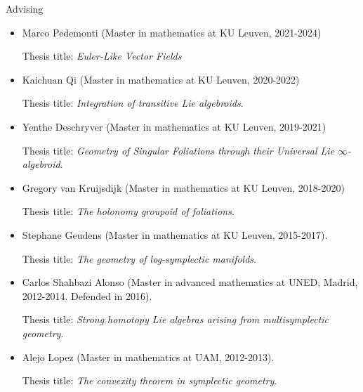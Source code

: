 \documentclass[12p]{resume}
\begin{document}
\begin{category}{Advising}
\begin{itemize}
Thesis title: \emph{Multisymplectic Manifolds and their Symmetries}

\item Marco Pedemonti (Master in mathematics at KU Leuven, 2021-2024)

Thesis title: \emph{Euler-Like Vector Fields}

 \item Kaichuan Qi (Master in mathematics at KU Leuven, 2020-2022)
 
Thesis title: \emph{Integration of transitive Lie algebroids}.

 \item Yenthe Deschryver (Master in mathematics at KU Leuven, 2019-2021)
 
Thesis title: \emph{Geometry of Singular Foliations through their Universal Lie $\infty$-algebroid}.

 \item Gregory van Kruijsdijk (Master in mathematics at KU Leuven, 2018-2020)
 
Thesis title: \emph{The holonomy groupoid of foliations}.

 \item 
Stephane Geudens (Master in mathematics at KU Leuven, 2015-2017).

Thesis title: \emph{The geometry of log-symplectic manifolds}.

%

 \item 
  Carlos Shahbazi Alonso (Master  in advanced mathematics at UNED, Madrid, 2012-2014. Defended in 2016).

Thesis title: \emph{Strong homotopy Lie algebras arising from multisymplectic geometry}.

\item Alejo Lopez (Master in mathematics at UAM, 2012-2013).

Thesis title: \emph{The convexity theorem in symplectic geometry}.
 
\end{itemize}






\end{category}
\end{document}

